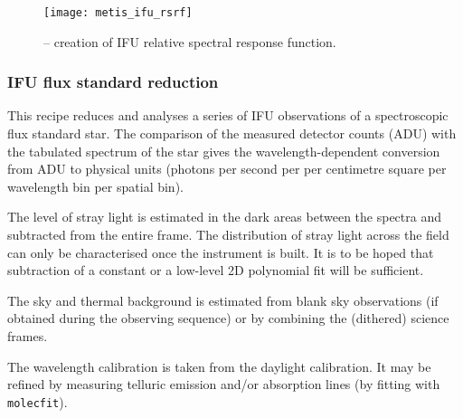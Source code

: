 \begin{figure}[hb]
  \centering
  \texttt{[image: metis\_ifu\_rsrf]}
  \caption[Recipe: ]{ --
    creation of IFU relative spectral response function.}
  \label{fig:metis_ifu_rsrf}
\end{figure}


\clearpage
\subsubsection{IFU flux standard reduction}
\label{sssec:ifu_std_process}
\label{rec:metis_ifu_std_process}

This recipe reduces and analyses a series of IFU observations of a
spectroscopic flux standard star. The comparison of the measured
detector counts (ADU) with the tabulated spectrum of the star gives
the wavelength-dependent conversion from ADU to physical units
(photons per second per per centimetre square per wavelength bin per
spatial bin).

The level of stray light is estimated in the dark areas between the
spectra and subtracted from the entire frame. The distribution of
stray light across the field can only be characterised once the
instrument is built. It is to be hoped that subtraction of a constant
or a low-level 2D polynomial fit will be sufficient.

The sky and thermal background is estimated from blank sky
observations (if obtained during the observing sequence) or by
combining the (dithered) science frames.

The wavelength calibration is taken from the daylight calibration. It
may be refined by measuring telluric emission and/or absorption lines
(by fitting with \lstinline{molecfit}).

